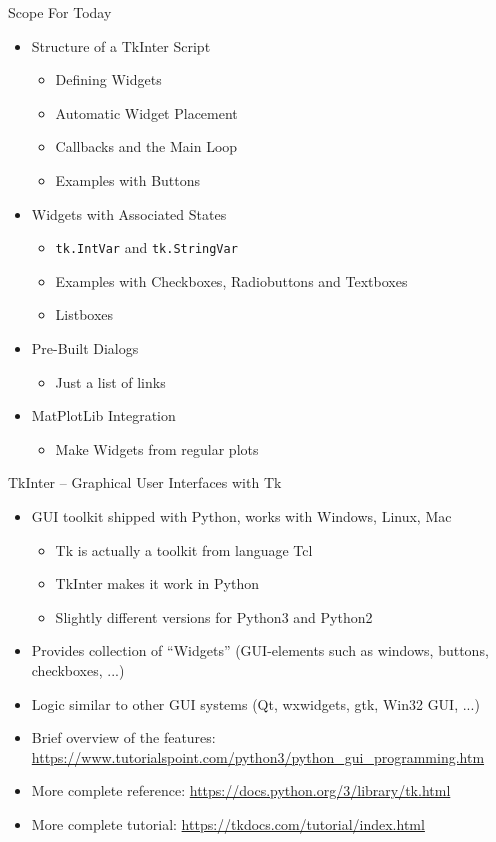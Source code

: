 
\begin{frame}{Scope For Today}
%
\begin{itemize}
\item Structure of a TkInter Script
	\begin{itemize}
	\item Defining Widgets
	\item Automatic Widget Placement
	\item Callbacks and the Main Loop
	\item Examples with Buttons
	\end{itemize}
\item Widgets with Associated States
	\begin{itemize}
	\item \texttt{tk.IntVar} and \texttt{tk.StringVar}
	\item Examples with Checkboxes, Radiobuttons and Textboxes
	\item Listboxes
	\end{itemize}
\item Pre-Built Dialogs
	\begin{itemize}
	\item Just a list of links
	\end{itemize}
\item MatPlotLib Integration
	\begin{itemize}
	\item Make Widgets from regular plots
	\end{itemize}
\end{itemize}
%
\end{frame}


\begin{frame}{TkInter -- Graphical User Interfaces with Tk}
%
\begin{itemize}
\item GUI toolkit shipped with Python, works with Windows, Linux, Mac
	\begin{itemize}
	\item Tk is actually a toolkit from language Tcl
	\item TkInter makes it work in Python
	\item Slightly different versions for Python3 and Python2
	\end{itemize}
\item Provides collection of \enquote{Widgets} (GUI-elements such as windows, buttons, checkboxes, ...)
\item Logic similar to other GUI systems (\zB Qt, wxwidgets, gtk, Win32 GUI, ...)
\item Brief overview of the features: \url{https://www.tutorialspoint.com/python3/python_gui_programming.htm}
\item More complete reference: \url{https://docs.python.org/3/library/tk.html}
\item More complete tutorial: \url{https://tkdocs.com/tutorial/index.html}
\end{itemize}
%
\end{frame}

